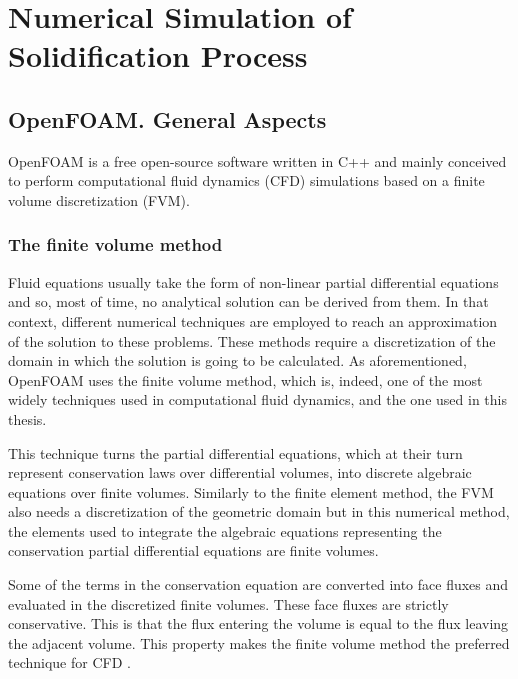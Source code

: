 
\chapter{Numerical Simulation of Solidification Process} %

\label{Chapter3} %
\section{OpenFOAM. General Aspects}

\setlength{\parindent}{0.5cm} OpenFOAM is a free open-source software written in C++ and mainly conceived to perform computational fluid dynamics (CFD) simulations based on a finite volume discretization (FVM). 

\subsection{The finite volume method}

\setlength{\parindent}{0.5cm} Fluid equations usually take the form of non-linear partial differential equations and so, most of time, no analytical solution can be derived from them. In that context, different numerical techniques are employed to reach an approximation of the solution to these problems. These methods require a discretization of the domain in which the solution is going to be calculated. As aforementioned, OpenFOAM uses the finite volume method, which is, indeed, one of the most widely techniques used in computational fluid dynamics, and the one used in this thesis.

\noindent This technique turns the partial differential equations, which at their turn represent conservation laws over differential volumes, into discrete algebraic equations over finite volumes. Similarly to the finite element method, the FVM also needs a discretization of the geometric domain but in this numerical method, the elements used to integrate the algebraic equations representing the conservation partial differential equations are finite volumes.

\noindent Some of the terms in the conservation equation are converted into face fluxes and evaluated in the discretized finite volumes. These face fluxes are strictly conservative. This is that the flux entering the volume is equal to the flux leaving the adjacent volume. This property makes the finite volume method the preferred technique for CFD \cite{moukalled_mangani_darwish_2016}. 

